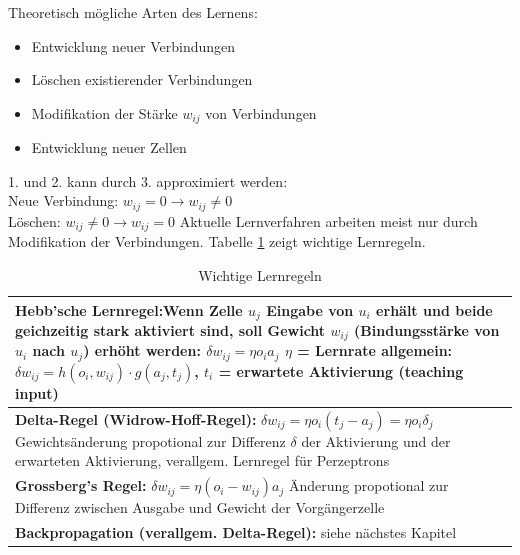Theoretisch mögliche Arten des Lernens:
\begin{itemize}
\item[1.]Entwicklung neuer Verbindungen
\item[2.]Löschen existierender Verbindungen
\item[3.]Modifikation der Stärke $w_{ij}$ von Verbindungen
\item[4.]Entwicklung neuer Zellen
\end{itemize}
1. und 2. kann durch 3. approximiert werden:\\
Neue Verbindung: $w_{ij} = 0 \rightarrow w_{ij} \neq 0$\\
Löschen: $w_{ij} \neq 0 \rightarrow w_{ij} = 0$
Aktuelle Lernverfahren arbeiten meist nur durch Modifikation der Verbindungen.
Tabelle \ref{tab:lernregeln} zeigt wichtige Lernregeln.
\begin{table}
\centering
\begin{tabular}{|p{9cm}|}
	\hline
	\textbf{Hebb'sche Lernregel:}\newline Wenn Zelle $u_j$ Eingabe von $u_i$ erhält und beide geichzeitig stark aktiviert sind, soll Gewicht $w_{ij}$ (Bindungsstärke von $u_i$ nach $u_j$) erhöht werden: \newline $\delta w_{ij} = \eta o_ia_j$ \newline $\eta$ = Lernrate \newline
	allgemein: $\delta w_{ij} = h(o_i, w_{ij})\cdot g(a_j, t_j)$, \newline
	$t_i$ = erwartete Aktivierung (\glqq teaching input\grqq)\\
	\hline
	\textbf{Delta-Regel (Widrow-Hoff-Regel):}\newline
	$\delta w_{ij} = \eta o_i(t_j - a_j) = \eta o_i \delta_j$ \newline Gewichtsänderung propotional zur Differenz $\delta$  der Aktivierung und der erwarteten Aktivierung, verallgem. Lernregel für Perzeptrons\\
	\hline
	\textbf{Grossberg's Regel:} \newline
	$\delta w_{ij} = \eta (o_i - w_{ij})a_j$ \newline
	Änderung propotional zur Differenz zwischen Ausgabe und Gewicht der Vorgängerzelle\\
	\hline
	\textbf{Backpropagation (verallgem. Delta-Regel):}
	siehe nächstes Kapitel\\
	\hline
\end{tabular}
\caption{Wichtige Lernregeln}
\label{tab:lernregeln}
\end{table}

